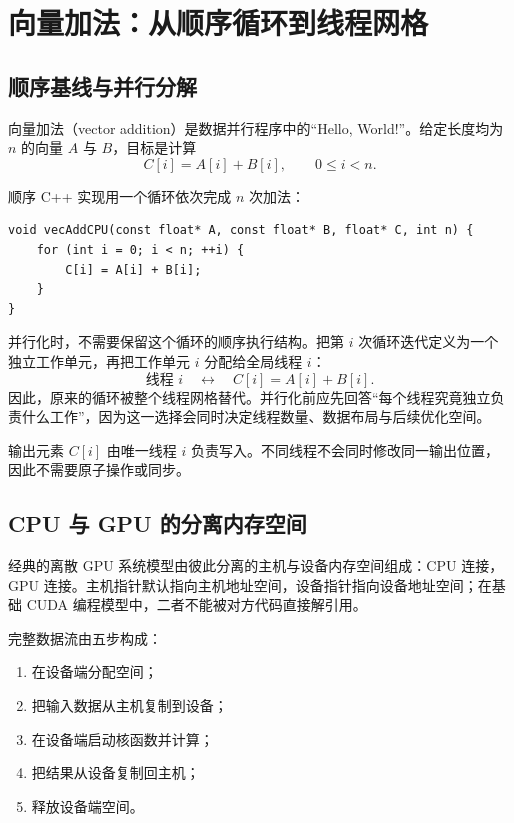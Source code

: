 \section{向量加法：从顺序循环到线程网格}

\subsection{顺序基线与并行分解}

向量加法（vector addition）是数据并行程序中的“Hello, World!”。给定长度均为 $n$ 的向量 $A$ 与 $B$，目标是计算
\[
C[i]=A[i]+B[i],\qquad 0\le i<n.
\]
\par\noindent\begin{minipage}{\linewidth}
顺序 C++ 实现用一个循环依次完成 $n$ 次加法：

\begin{lstlisting}[style=cuda]
void vecAddCPU(const float* A, const float* B, float* C, int n) {
    for (int i = 0; i < n; ++i) {
        C[i] = A[i] + B[i];
    }
}
\end{lstlisting}
\end{minipage}\par

并行化时，不需要保留这个循环的顺序执行结构。把第 $i$ 次循环迭代定义为一个独立工作单元，再把工作单元 $i$ 分配给全局线程 $i$：
\[
\text{线程 }i\quad\longleftrightarrow\quad C[i]=A[i]+B[i].
\]
因此，原来的循环被整个线程网格替代。并行化前应先回答“每个线程究竟独立负责什么工作”，因为这一选择会同时决定线程数量、数据布局与后续优化空间。

\begin{keybox}[title={唯一写入者映射}]
输出元素 $C[i]$ 由唯一线程 $i$ 负责写入。不同线程不会同时修改同一输出位置，因此不需要原子操作或同步。
\end{keybox}

\subsection{CPU 与 GPU 的分离内存空间}

经典的离散 GPU 系统模型由彼此分离的主机与设备内存空间组成：CPU 连接，GPU 连接。主机指针默认指向主机地址空间，设备指针指向设备地址空间；在基础 CUDA 编程模型中，二者不能被对方代码直接解引用。


完整数据流由五步构成：
\begin{enumerate}
  \item 在设备端分配空间；
  \item 把输入数据从主机复制到设备；
  \item 在设备端启动核函数并计算；
  \item 把结果从设备复制回主机；
  \item 释放设备端空间。
\end{enumerate}

